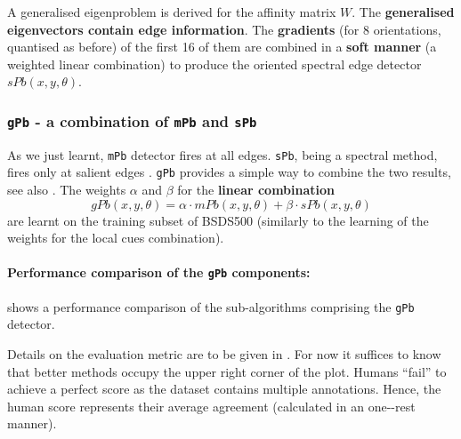 A generalised eigenproblem is derived for the affinity matrix $W$. The {\bf generalised eigenvectors contain edge information}. %
The {\bf gradients} %
(for 8 orientations, quantised as before) of the first 16 %
of them %
are combined in a {\bf soft manner} (a weighted linear combination) %
to produce the oriented spectral edge detector $sPb(x,y,\theta)$.

\subsubsection{{\tt gPb} - a combination of {\tt mPb} and {\tt sPb}}
\label{sec:ch3-Pb_mPb_sPb_gPb}
As we just learnt, {\tt mPb} detector fires at all edges. {\tt sPb}, being a spectral method, fires only at salient edges \cite{Fowlkes04,Yu2005segmentation}. {\tt gPb} provides a simple way to combine the two results, see also . The weights $\alpha$ and $\beta$ for the {\bf linear combination} 
\begin{equation}
 gPb(x,y,\theta)=\alpha \cdot mPb(x,y,\theta) + \beta \cdot sPb(x,y,\theta)
\end{equation}
are learnt on the training subset of BSDS500 \cite{BSDS500resources} (similarly to the learning of the weights for the local cues combination). %

\paragraph{Performance comparison of the {\tt gPb} components:} 
\label{par:ch3-Pb_mPb_sPb_gPb}
 shows a performance comparison of the sub-algorithms comprising the {\tt gPb} detector. 

Details on the evaluation metric are to be given in . For now it suffices to know that better methods occupy the upper right corner of the plot. Humans ``fail'' to achieve %
a perfect score as the dataset contains multiple annotations. Hence, the human score represents their average agreement (calculated in an one-\vs-rest manner). 

